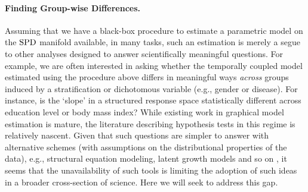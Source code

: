 \paragraph{Finding Group-wise Differences.} Assuming that we have a black-box procedure to estimate a parametric model on the $\text{SPD}$ manifold available, 
in many tasks, such an estimation is merely a segue to other analyses designed to answer scientifically meaningful questions. 
For example, we are often interested in asking whether the temporally coupled model estimated using the procedure above differs 
in meaningful ways {\em across} groups induced by a stratification or dichotomous variable (e.g., gender or disease). For instance, is the `slope' in a structured response space statistically different 
across education level or body mass index? 
While existing work in graphical model estimation is mature, the literature describing hypothesis tests in this
regime \citep{diffnet,belilovsky2015hypothesis}
is relatively nascent.
Given that such questions are simpler to answer with alternative schemes (with assumptions on the distributional properties of the data), e.g., structural equation modeling, 
latent growth models and so on \citep{ullman2003structural, mcardle2000introduction}, it seems that 
the unavailability of such tools is limiting the adoption of such ideas in a broader 
cross-section of science. Here we will seek to address this gap. 

